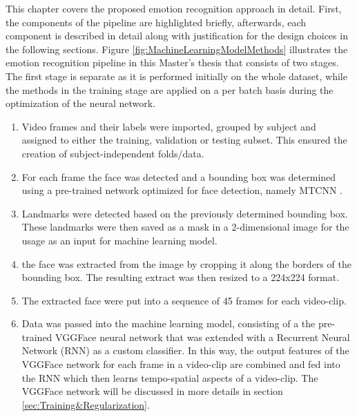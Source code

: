 \noindent This chapter covers the proposed emotion recognition approach in detail. First, the components of the pipeline are highlighted briefly, afterwards, each component is described in detail along with justification for the design choices in the following sections. 
\newline\newline
Figure \ref{fig:MachineLearningModelMethods} illustrates the emotion recognition pipeline in this Master's thesis that consists of two stages. The first stage is separate as it is performed initially on the whole dataset, while the methods in the training stage are applied on a per batch basis during the optimization of the neural network.

\begin{enumerate}
    \item Video frames and their labels were imported, grouped by subject and assigned to either the training, validation or testing subset. This ensured the creation of subject-independent folds/data.
    \item For each frame the face was detected and a bounding box was determined using a pre-trained network optimized for face detection, namely MTCNN \citep{Zhang:2016:MTCCN}.
    \item Landmarks were detected based on the previously determined bounding box. These landmarks were then saved as a mask in a 2-dimensional image for the usage as an input for machine learning model.
    \item the face was extracted from the image by cropping it along the borders of the bounding box. The resulting extract was then resized to a 224x224 format.
    \item The extracted face were put into a sequence of 45 frames for each video-clip.
    \item Data was passed into the machine learning model, consisting of a the pre-trained VGGFace \citep{Cao:2018:VGGFace2} neural network that was extended with a Recurrent Neural Network (RNN) as a custom classifier. In this way, the output features of the VGGFace network for each frame in a video-clip are combined and fed into the RNN which then learns  tempo-spatial aspects of a video-clip. The VGGFace network will be discussed in more details in section \ref{sec:Training&Regularization}.
\end{enumerate}


